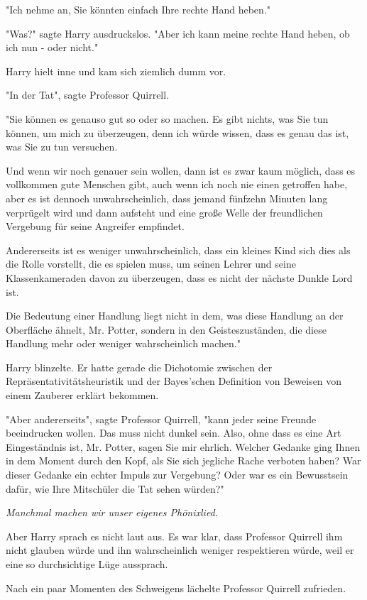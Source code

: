 {"Ich nehme an, Sie könnten einfach Ihre rechte Hand heben."

"Was?" sagte Harry ausdruckslos. "Aber ich kann meine rechte Hand heben, ob ich nun - oder nicht."

Harry hielt inne und kam sich ziemlich dumm vor.

"In der Tat", sagte Professor Quirrell.

"Sie können es genauso gut so oder so machen. Es gibt nichts, was Sie tun können, um mich zu überzeugen, denn ich würde wissen, dass es genau das ist, was Sie zu tun versuchen.

Und wenn wir noch genauer sein wollen, dann ist es zwar kaum möglich, dass es vollkommen gute Menschen gibt, auch wenn ich noch nie einen getroffen habe, aber es ist dennoch unwahrscheinlich, dass jemand fünfzehn Minuten lang verprügelt wird und dann aufsteht und eine große Welle der freundlichen Vergebung für seine Angreifer empfindet.

Andererseits ist es weniger unwahrscheinlich, dass ein kleines Kind sich dies als die Rolle vorstellt, die es spielen muss, um seinen Lehrer und seine Klassenkameraden davon zu überzeugen, dass es nicht der nächste Dunkle Lord ist.

Die Bedeutung einer Handlung liegt nicht in dem, was diese Handlung an der Oberfläche ähnelt, Mr. Potter, sondern in den Geisteszuständen, die diese Handlung mehr oder weniger wahrscheinlich machen."

Harry blinzelte. Er hatte gerade die Dichotomie zwischen der Repräsentativitätsheuristik und der Bayes'schen Definition von Beweisen von einem Zauberer erklärt bekommen.

"Aber andererseits", sagte Professor Quirrell, "kann jeder seine Freunde beeindrucken wollen. Das muss nicht dunkel sein. Also, ohne dass es eine Art Eingeständnis ist, Mr. Potter, sagen Sie mir ehrlich. Welcher Gedanke ging Ihnen in dem Moment durch den Kopf, als Sie sich jegliche Rache verboten haben? War dieser Gedanke ein echter Impuls zur Vergebung? Oder war es ein Bewusstsein dafür, wie Ihre Mitschüler die Tat sehen würden?"

\emph{Manchmal machen wir unser eigenes Phönixlied.}

Aber Harry sprach es nicht laut aus. Es war klar, dass Professor Quirrell ihm nicht glauben würde und ihn wahrscheinlich weniger respektieren würde, weil er eine so durchsichtige Lüge aussprach.

Nach ein paar Momenten des Schweigens lächelte Professor Quirrell zufrieden.

}
